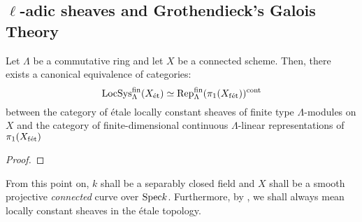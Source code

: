     \subsection{\texorpdfstring{$\ell$}{}-adic sheaves and Grothendieck's Galois Theory}
        \begin{lemma} \label{lemma: etale_monodromy}
            Let $\Lambda$ be a commutative ring and let $X$ be a connected scheme. Then, there exists a canonical equivalence of categories:
                $$\mathrm{LocSys}_{\Lambda}^{\mathrm{fin}}(X_{\mathrm{\acute{e}t}}) \simeq \mathrm{Rep}_{\Lambda}^{\mathrm{fin}}(\pi_1(X_{\mathrm{f\acute{e}t}}))^{\mathrm{cont}}$$
            between the category of \'etale locally constant sheaves of finite type $\Lambda$-modules on $X$ and the category of finite-dimensional continuous $\Lambda$-linear representations of $\pi_1(X_{\mathrm{f\acute{e}t}})$
        \end{lemma}
            \begin{proof}
                
            \end{proof}
    
        \begin{convention} \label{conv: base_curve}
            From this point on, $k$ shall be a separably closed field and $X$ shall be a smooth projective \textit{connected} curve over $\mathrm{Spec} k$. Furthermore, by , we shall always mean locally constant sheaves in the \'etale topology.
        \end{convention}
        
